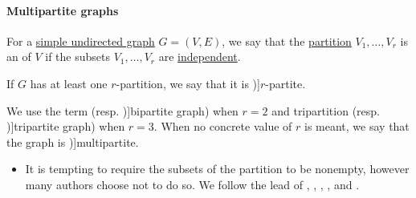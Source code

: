 \paragraph{Multipartite graphs}

\begin{definition}\label{def:multipartite_graph}
  For a \hyperref[def:undirected_graph]{simple undirected graph} \( G = (V, E) \), we say that the \hyperref[def:set_partition]{partition} \( V_1, \ldots, V_r \) is an  of \( V \) if the subsets \( V_1, \ldots, V_r \) are \hyperref[def:graph_independent_set]{independent}.

  If \( G \) has at least one \( r \)-partition, we say that it is \term[ru=\( r \)-дольный (граф) (\cite[11]{ЕмеличевИПр1990ТеорияГрафов})]{\( r \)-partite}.

  We use the term  (resp. \term[ru=двудольный (граф) (\cite[11]{ЕмеличевИПр1990ТеорияГрафов})]{bipartite graph}) when \( r = 2 \) and tripartition (resp. \term[ru=трёхдольный (граф) (\cite[11]{ЕмеличевИПр1990ТеорияГрафов})]{tripartite graph}) when \( r = 3 \). When no concrete value of \( r \) is meant, we say that the graph is \term[en=multipartite (graph) (\cite[ex. 8.5.5]{Knauer2019AlgebraicGraphTheory})]{multipartite}.
\end{definition}
\begin{itemize}
  \item It is tempting to require the subsets of the partition to be nonempty, however many authors choose not to do so. We follow the lead of
  \cite[17]{Diestel2017GraphTheory},
  \cite[27]{Harary1969GraphTheory},
  \cite[6]{Bollobás1998ModernGraphTheory},
  \cite[def. 1.3.1]{Knauer2019AlgebraicGraphTheory},
  \cite[26]{GondranMinoux1984GraphsAndAlgorithms} and
  \cite[11]{ЕмеличевИПр1990ТеорияГрафов}.
\end{itemize}

